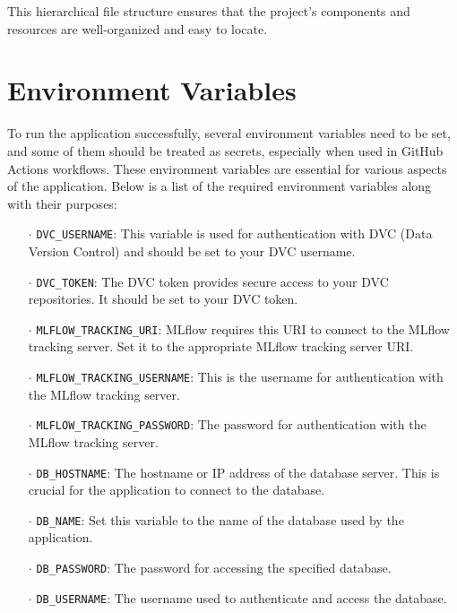 \documentclass{report}
\begin{document}
This hierarchical file structure ensures that the project's components and resources are well-organized and easy to locate.
\section{Environment Variables}
To run the application successfully, several environment variables need to be set, and some of them should be treated as secrets, especially when used in GitHub Actions workflows. These environment variables are essential for various aspects of the application. Below is a list of the required environment variables along with their purposes:

\begin{itemize}
  \item[$\cdot$] \texttt{DVC\_USERNAME}: This variable is used for authentication with DVC (Data Version Control) and should be set to your DVC username.

  \item[$\cdot$] \texttt{DVC\_TOKEN}: The DVC token provides secure access to your DVC repositories. It should be set to your DVC token.

  \item[$\cdot$] \texttt{MLFLOW\_TRACKING\_URI}: MLflow requires this URI to connect to the MLflow tracking server. Set it to the appropriate MLflow tracking server URI.

  \item[$\cdot$] \texttt{MLFLOW\_TRACKING\_USERNAME}: This is the username for authentication with the MLflow tracking server.

  \item[$\cdot$] \texttt{MLFLOW\_TRACKING\_PASSWORD}: The password for authentication with the MLflow tracking server.

  \item[$\cdot$] \texttt{DB\_HOSTNAME}: The hostname or IP address of the database server. This is crucial for the application to connect to the database.

  \item[$\cdot$] \texttt{DB\_NAME}: Set this variable to the name of the database used by the application.

  \item[$\cdot$] \texttt{DB\_PASSWORD}: The password for accessing the specified database.

  \item[$\cdot$] \texttt{DB\_USERNAME}: The username used to authenticate and access the database.


\end{itemize}
\end{document}
